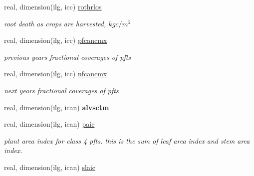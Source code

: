 \begin{DoxyCompactItemize}
\item 
\hypertarget{structctem__statevars_1_1veg__gat_aa467987d07da5b46b819e3f70e6ff666}{}real, dimension(ilg, icc) \hyperlink{structctem__statevars_1_1veg__gat_aa467987d07da5b46b819e3f70e6ff666}{rothrlos}\label{structctem__statevars_1_1veg__gat_aa467987d07da5b46b819e3f70e6ff666}

\begin{DoxyCompactList}\small\item\em root death as crops are harvested, $kg c/m^2$ \end{DoxyCompactList}\item 
\hypertarget{structctem__statevars_1_1veg__gat_aa0322bbd78595c13e8c7caa32e404dec}{}real, dimension(ilg, icc) \hyperlink{structctem__statevars_1_1veg__gat_aa0322bbd78595c13e8c7caa32e404dec}{pfcancmx}\label{structctem__statevars_1_1veg__gat_aa0322bbd78595c13e8c7caa32e404dec}

\begin{DoxyCompactList}\small\item\em previous year\textquotesingle{}s fractional coverages of pfts \end{DoxyCompactList}\item 
\hypertarget{structctem__statevars_1_1veg__gat_a20fb8e551545284fce5270c22a1a3275}{}real, dimension(ilg, icc) \hyperlink{structctem__statevars_1_1veg__gat_a20fb8e551545284fce5270c22a1a3275}{nfcancmx}\label{structctem__statevars_1_1veg__gat_a20fb8e551545284fce5270c22a1a3275}

\begin{DoxyCompactList}\small\item\em next year\textquotesingle{}s fractional coverages of pfts \end{DoxyCompactList}\item 
\hypertarget{structctem__statevars_1_1veg__gat_ac563d9dfaf89822aa36582d112d0beb9}{}real, dimension(ilg, ican) {\bfseries alvsctm}\label{structctem__statevars_1_1veg__gat_ac563d9dfaf89822aa36582d112d0beb9}

\item 
\hypertarget{structctem__statevars_1_1veg__gat_a4bbd901308a22d59486c8a665fe450dc}{}real, dimension(ilg, ican) \hyperlink{structctem__statevars_1_1veg__gat_a4bbd901308a22d59486c8a665fe450dc}{paic}\label{structctem__statevars_1_1veg__gat_a4bbd901308a22d59486c8a665fe450dc}

\begin{DoxyCompactList}\small\item\em plant area index for class\textquotesingle{} 4 pfts. this is the sum of leaf area index and stem area index. \end{DoxyCompactList}\item 
\hypertarget{structctem__statevars_1_1veg__gat_a98953fd6bd2f597f2cc0b61ab2a5d9ba}{}real, dimension(ilg, ican) \hyperlink{structctem__statevars_1_1veg__gat_a98953fd6bd2f597f2cc0b61ab2a5d9ba}{slaic}\label{structctem__statevars_1_1veg__gat_a98953fd6bd2f597f2cc0b61ab2a5d9ba}


\end{DoxyCompactItemize}

